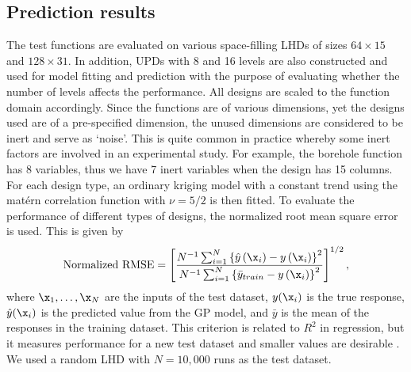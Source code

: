 \documentclass [PhD] {package/uclathes}
\begin{document}
\clearpage
\subsection{Prediction results}

The test functions are evaluated on various space-filling LHDs of sizes $64\times 15$ and $128\times 31$. In addition, UPDs with 8 and 16 levels are also constructed and used for model fitting and prediction with the purpose of evaluating whether the number of levels affects the performance. All designs are scaled to the function domain accordingly.
 Since the functions are of various dimensions, yet the designs used are of a pre-specified dimension, the unused dimensions are considered to be inert and serve as `noise'. This is quite common in practice whereby some inert factors are involved in an experimental study. For example, the borehole function has 8 variables, thus we have 7 inert variables when the design has 15 columns. For each design type, an ordinary kriging model with a constant trend using the mat\'ern correlation function with $\nu = 5/2$ is then fitted. To evaluate the performance of different types of designs, the normalized root mean square error is used. This is given by
$$
\text {Normalized RMSE}=\left[\frac{N^{-1} \sum_{i=1}^N\left\{\hat{y}\left(\x_i\right)-y\left(\x_i\right)\right\}^2}{N^{-1} \sum_{i=1}^N\left\{\bar{y}_{train}-y\left(\x_i\right)\right\}^2}\right]^{1 / 2},
$$
where $\x_1, \ldots, \x_N$ are the inputs of the test dataset, $y(\x_i)$ is the true response, $\hat{y}(\x_i)$ is the predicted value from the GP model, and $\bar{y}$ is the mean of the responses in the training dataset. This criterion is related to $R^2$ in regression, but it measures performance for a new test dataset and smaller values are desirable \parencite{chen2016analysis}. We used a random LHD with $N=10,000$ runs as the test dataset.
\end{document}
